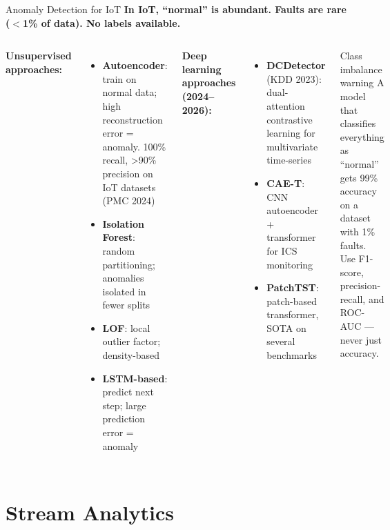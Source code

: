 \documentclass[aspectratio=169,11pt]{beamer}
\begin{document}
\begin{frame}{Anomaly Detection for IoT}
    \small
    \textbf{In IoT, ``normal'' is abundant. Faults are rare ($<$1\% of data). No labels available.}

    \vspace{0.05cm}
    \begin{columns}
        \textbf{Unsupervised approaches:}
        \begin{itemize}\setlength{\itemsep}{0pt}
            \item \textbf{Autoencoder}: train on normal data; high reconstruction error = anomaly. 100\% recall, >90\% precision on IoT datasets (PMC 2024)
            \item \textbf{Isolation Forest}: random partitioning; anomalies isolated in fewer splits
            \item \textbf{LOF}: local outlier factor; density-based
            \item \textbf{LSTM-based}: predict next step; large prediction error = anomaly
        \end{itemize}

        \textbf{Deep learning approaches (2024--2026):}
        \begin{itemize}\setlength{\itemsep}{0pt}
            \item \textbf{DCDetector} (KDD 2023): dual-attention contrastive learning for multivariate time-series
            \item \textbf{CAE-T}: CNN autoencoder + transformer for ICS monitoring
            \item \textbf{PatchTST}: patch-based transformer, SOTA on several benchmarks
        \end{itemize}

        \vspace{0.05cm}
        \begin{alertblock}{Class imbalance warning}
            A model that classifies everything as ``normal'' gets 99\% accuracy on a dataset with 1\% faults. Use F1-score, precision-recall, and ROC-AUC --- never just accuracy.
        \end{alertblock}
    \end{columns}
\end{frame}

\section{Stream Analytics}
\end{document}
